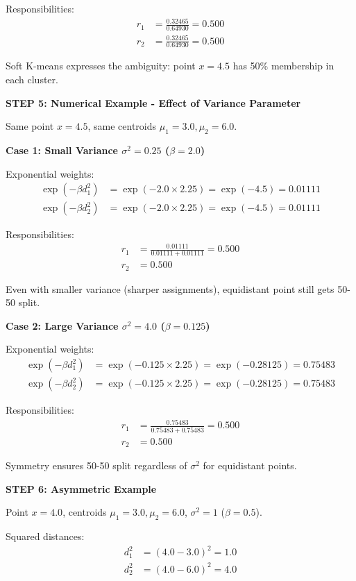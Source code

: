 \documentclass[12pt]{article}
\begin{document}
\begin{solution}
Responsibilities:
\begin{align*}
r_1 &= \frac{0.32465}{0.64930} = 0.500 \\
r_2 &= \frac{0.32465}{0.64930} = 0.500
\end{align*}

Soft K-means expresses the ambiguity: point $x = 4.5$ has 50\% membership in each cluster.

\textbf{STEP 5: Numerical Example - Effect of Variance Parameter}

Same point $x = 4.5$, same centroids $\mu_1 = 3.0, \mu_2 = 6.0$.

\textbf{Case 1: Small Variance $\sigma^2 = 0.25$ ($\beta = 2.0$)}

Exponential weights:
\begin{align*}
\exp(-\beta d_1^2) &= \exp(-2.0 \times 2.25) = \exp(-4.5) = 0.01111 \\
\exp(-\beta d_2^2) &= \exp(-2.0 \times 2.25) = \exp(-4.5) = 0.01111
\end{align*}

Responsibilities:
\begin{align*}
r_1 &= \frac{0.01111}{0.01111 + 0.01111} = 0.500 \\
r_2 &= 0.500
\end{align*}

Even with smaller variance (sharper assignments), equidistant point still gets 50-50 split.

\textbf{Case 2: Large Variance $\sigma^2 = 4.0$ ($\beta = 0.125$)}

Exponential weights:
\begin{align*}
\exp(-\beta d_1^2) &= \exp(-0.125 \times 2.25) = \exp(-0.28125) = 0.75483 \\
\exp(-\beta d_2^2) &= \exp(-0.125 \times 2.25) = \exp(-0.28125) = 0.75483
\end{align*}

Responsibilities:
\begin{align*}
r_1 &= \frac{0.75483}{0.75483 + 0.75483} = 0.500 \\
r_2 &= 0.500
\end{align*}

Symmetry ensures 50-50 split regardless of $\sigma^2$ for equidistant points.

\textbf{STEP 6: Asymmetric Example}

Point $x = 4.0$, centroids $\mu_1 = 3.0, \mu_2 = 6.0$, $\sigma^2 = 1$ ($\beta = 0.5$).

Squared distances:
\begin{align*}
d_1^2 &= (4.0 - 3.0)^2 = 1.0 \\
d_2^2 &= (4.0 - 6.0)^2 = 4.0
\end{align*}


\end{solution}
\end{document}
